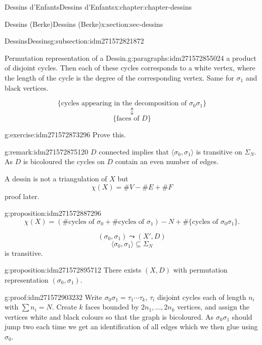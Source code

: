 \documentclass[oneside,10pt,]{book}
\numberwithin{equation}{section}
\begin{document}
\begin{chapterptx}{Dessins d'Enfants}{}{Dessins d'Enfants}{}{}{x:chapter:chapter-dessins}
\begin{sectionptx}{Dessins (Berke)}{}{Dessins (Berke)}{}{}{x:section:sec-dessins}
\begin{subsectionptx}{Dessins}{}{Dessins}{}{}{g:subsection:idm271572821872}
\begin{paragraphs}{Permutation representation of a Dessin.}{g:paragraphs:idm271572855024}
a product of disjoint cycles. Then each of these cycles corresponds to a  white vertex, where the length of the cycle is the degree of the corresponding vertex. Same for \(\sigma_1\) and black vertices.%
\par
%
\begin{equation*}
\{\text{cycles appearing in the decomposition of }\sigma_0\sigma_1\}
\end{equation*}
%
\begin{equation*}
\updownarrow
\end{equation*}
%
\begin{equation*}
\{\text{faces of }D\}
\end{equation*}
%
\begin{inlineexercise}{}{g:exercise:idm271572873296}%
Prove this.%
\end{inlineexercise}
\begin{remark}{}{g:remark:idm271572875120}%
\(D\) connected implies that \(\langle \sigma_0, \sigma_1 \rangle\) is transitive on \(\Sigma_N\). As \(D\) is bicoloured the cycles on \(D\) contain an even number of edges.%
\end{remark}
A dessin is not a triangulation of \(X\) but%
\begin{equation*}
\chi (X) = \#V -  \#E  + \#F
\end{equation*}
proof later.%
\begin{proposition}{}{}{g:proposition:idm271572887296}%
%
\begin{equation*}
\chi(X) = (\#\text{cycles of }\sigma_0+\#\text{cycles of }\sigma_1) - N + \#\{\text{cycles of }\sigma_0\sigma_1\}\text{.}
\end{equation*}
%
\end{proposition}
%
\begin{equation*}
(\sigma_0, \sigma_1) \leadsto (X',D)
\end{equation*}
%
\begin{equation*}
\langle \sigma_0, \sigma_1 \rangle \subseteq \Sigma_N
\end{equation*}
is transitive.%
\begin{proposition}{}{}{g:proposition:idm271572895712}%
There exists \((X,D)\) with permutation representation \((\sigma_0, \sigma_1)\).%
\end{proposition}
\begin{proofptx}{}{g:proof:idm271572903232}
Write \(\sigma_0\sigma_1 = \tau_1 \cdots \tau_k\), \(\tau_i\) disjoint cycles each of length \(n_i\) with \(\sum n_i = N\). Create \(k\) faces bounded by \(2n_1, \ldots, 2n_k\) vertices, and assign the vertices white and black colours so that the graph is bicoloured. As \(\sigma_0\sigma_1\) should jump two each time we get an identification of all edges which we then  glue using \(\sigma_0\).%

\end{proofptx}
\end{paragraphs}
\end{subsectionptx}
\end{sectionptx}
\end{chapterptx}
\end{document}
